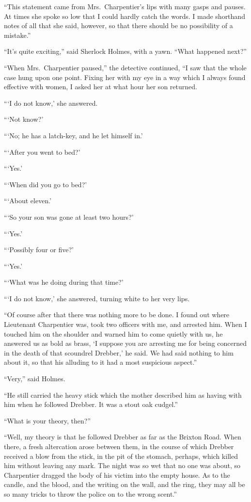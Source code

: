 \documentclass[12pt,english,oneside]{book}
\begin{document}
{}``This statement came from Mrs.\ Charpentier's lips with many
gasps and pauses. At times she spoke so low that I could hardly catch
the words. I made shorthand notes of all that she said, however, so
that there should be no possibility of a mistake.''

{}``It's quite exciting,'' said Sherlock Holmes, with a yawn. {}``What
happened next?''

{}``When Mrs.\ Charpentier paused,'' the detective continued, {}``I
saw that the whole case hung upon one point. Fixing her with my eye
in a way which I always found effective with women, I asked her at
what hour her son returned.

{}```I do not know,' she answered.

{}```Not know?'

{}```No; he has a latch-key, and he let himself in.'

{}```After you went to bed?'

{}```Yes.'

{}```When did you go to bed?'

{}```About eleven.'

{}```So your son was gone at least two hours?'

{}```Yes.'

{}```Possibly four or five?'

{}```Yes.'

{}```What was he doing during that time?'

{}```I do not know,' she answered, turning white to her very lips.

{}``Of course after that there was nothing more to be done. I found
out where Lieutenant Charpentier was, took two officers with me, and
arrested him. When I touched him on the shoulder and warned him to
come quietly with us, he answered us as bold as brass, `I suppose
you are arresting me for being concerned in the death of that scoundrel
Drebber,' he said. We had said nothing to him about it, so that his
alluding to it had a most suspicious aspect.''

{}``Very,'' said Holmes.

{}``He still carried the heavy stick which the mother described him
as having with him when he followed Drebber. It was a stout oak cudgel.''

{}``What is your theory, then?''

{}``Well, my theory is that he followed Drebber as far as the Brixton
Road. When there, a fresh altercation arose between them, in the course
of which Drebber received a blow from the stick, in the pit of the
stomach, perhaps, which killed him without leaving any mark. The night
was so wet that no one was about, so Charpentier dragged the body
of his victim into the empty house. As to the candle, and the blood,
and the writing on the wall, and the ring, they may all be so many
tricks to throw the police on to the wrong scent.''
\end{document}
